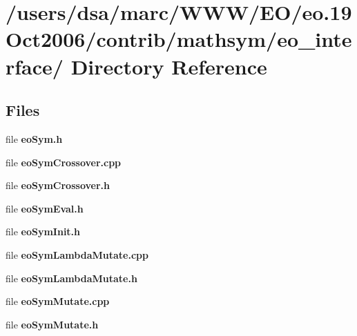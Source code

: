 \section{/users/dsa/marc/WWW/EO/eo.19Oct2006/contrib/mathsym/eo\_\-interface/ Directory Reference}
\label{dir_000018}
\subsection*{Files}
\begin{CompactItemize}
\item 
file {\bf eoSym.h}
\item 
file {\bf eoSymCrossover.cpp}
\item 
file {\bf eoSymCrossover.h}
\item 
file {\bf eoSymEval.h}
\item 
file {\bf eoSymInit.h}
\item 
file {\bf eoSymLambdaMutate.cpp}
\item 
file {\bf eoSymLambdaMutate.h}
\item 
file {\bf eoSymMutate.cpp}
\item 
file {\bf eoSymMutate.h}
\end{CompactItemize}
